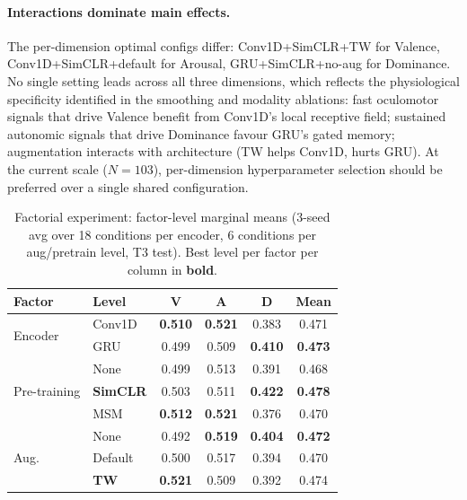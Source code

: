 \documentclass[sigconf,review,anonymous]{acmart}
\begin{document}
\paragraph{Interactions dominate main effects.}
The per-dimension optimal configs differ: Conv1D+SimCLR+TW for Valence,
Conv1D+SimCLR+default for Arousal, GRU+SimCLR+no-aug for Dominance.
No single setting leads across all three dimensions, which reflects the
physiological specificity identified in the smoothing and modality ablations:
fast oculomotor signals that drive Valence benefit from Conv1D's local
receptive field; sustained autonomic signals that drive Dominance favour
GRU's gated memory; augmentation interacts with architecture
(TW helps Conv1D, hurts GRU).
At the current scale ($N{=}103$), per-dimension hyperparameter selection
should be preferred over a single shared configuration.

\begin{table}[t]
\caption{Factorial experiment: factor-level marginal means (3-seed avg
over 18 conditions per encoder, 6 conditions per aug/pretrain level, T3 test).
Best level per factor per column in \textbf{bold}.}
\label{tab:factorial_marginals}
\centering
\setlength{\tabcolsep}{4.5pt}
\small
\begin{tabular}{llcccc}
\toprule
\textbf{Factor} & \textbf{Level} & \textbf{V} & \textbf{A} & \textbf{D} & \textbf{Mean} \\
\midrule
\multirow{2}{*}{Encoder}
  & Conv1D & \textbf{0.510} & \textbf{0.521} & 0.383 & 0.471 \\
  & GRU    & 0.499 & 0.509 & \textbf{0.410} & \textbf{0.473} \\
\midrule
\multirow{3}{*}{Pre-training}
  & None   & 0.499 & 0.513 & 0.391 & 0.468 \\
  & \textbf{SimCLR} & 0.503 & 0.511 & \textbf{0.422} & \textbf{0.478} \\
  & MSM    & \textbf{0.512} & \textbf{0.521} & 0.376 & 0.470 \\
\midrule
\multirow{3}{*}{Aug.}
  & None    & 0.492 & \textbf{0.519} & \textbf{0.404} & \textbf{0.472} \\
  & Default & 0.500 & 0.517 & 0.394 & 0.470 \\
  & \textbf{TW}  & \textbf{0.521} & 0.509 & 0.392 & 0.474 \\
\bottomrule
\end{tabular}
\end{table}
\end{document}
